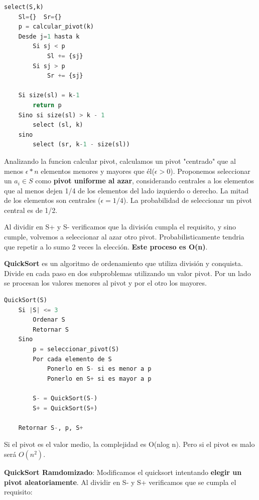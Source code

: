 \documentclass{article}
\begin{document}
\begin{lstlisting}[language=Python, caption=Algoritmo para calcular la mediana utilizando división y conquista]
select(S,k)
    Sl={}  Sr={}
    p = calcular_pivot(k)
    Desde j=1 hasta k
        Si sj < p
            Sl += {sj}
        Si sj > p
            Sr += {sj}
    
    Si size(sl) = k-1
        return p
    Sino si size(sl) > k - 1
        select (sl, k)
    sino 
        select (sr, k-1 - size(sl))

\end{lstlisting}    
    
Analizando la funcion calcular pivot, calculamos un pivot "centrado" que al menos
\(\epsilon*n\) elementos menores y mayores que él(\(\epsilon>0\)). 
Proponemos seleccionar un \(a_i \in S\) como \textbf{pivot uniforme al azar},
considerando centrales a los elementos que al menos dejen 1/4 de los elementos 
del lado izquierdo o derecho. La mitad de los elementos son centrales (\(\epsilon = 1/4\)).
La probabilidad de seleccionar un pivot central es de 1/2.

Al dividir en S+ y S- verificamos que la división cumpla el requisito, y sino cumple,
volvemos a seleccionar al azar otro pivot. Probabilisticamente tendria que repetir
a lo sumo 2 veces la elección. \textbf{Este proceso es O(n)}.

\textbf{QuickSort} es un algoritmo de ordenamiento que utiliza división y conquista.
Divide en cada paso en dos subproblemas utilizando un valor pivot.
Por un lado se procesan los valores menores al pivot y por el otro los mayores.

\begin{lstlisting}[language=Python, caption=Algoritmo QuickSort]
QuickSort(S)
    Si |S| <= 3
        Ordenar S
        Retornar S
    Sino
        p = seleccionar_pivot(S)
        Por cada elemento de S
            Ponerlo en S- si es menor a p
            Ponerlo en S+ si es mayor a p

        S- = QuickSort(S-)
        S+ = QuickSort(S+)
    
    Retornar S-, p, S+
\end{lstlisting} 

Si el pivot es el valor medio, la complejidad es O(nlog n). Pero si el pivot es malo será \(O(n^2)\).

\textbf{QuickSort Ramdomizado}: Modificamos el quicksort intentando \textbf{elegir un pivot aleatoriamente}.
Al dividir en S- y S+ verificamos que se cumpla el requisito:
\end{document}
